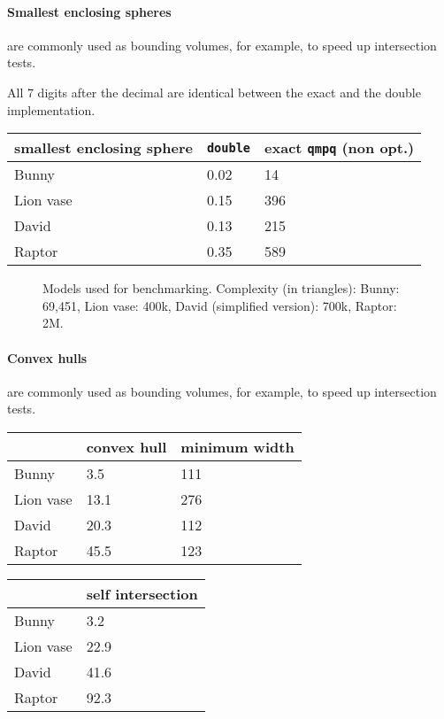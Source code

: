 
\paragraph{Smallest enclosing spheres} are commonly used as bounding
volumes, for example, to speed up intersection tests.

All 7 digits after the decimal are identical between the exact and the
double implementation.

\begin{tabular}{l|ll}
  \textbf{smallest enclosing sphere} & \texttt{double} & exact
    \texttt{qmpq} (non opt.)\\\hline
  Bunny     & 0.02 &  14 \\
  Lion vase & 0.15 & 396 \\
  David     & 0.13 & 215 \\
  Raptor    & 0.35  & 589
\end{tabular}


\begin{figure}
  \centering
  \caption{Models used for benchmarking. 
           Complexity (in triangles):
           Bunny: 69,451,
           Lion vase: 400k,
           David (simplified version): 700k,
           Raptor: 2M.}
  \label{fig:models}
\end{figure}

\paragraph{Convex hulls} are commonly used as bounding
volumes, for example, to speed up intersection tests.

\begin{tabular}{l|ll}
  & \textbf{convex hull} & \textbf{minimum width} \\\hline
  Bunny     &  3.5 & 111 \\
  Lion vase & 13.1 & 276 \\
  David     & 20.3 & 112 \\
  Raptor    & 45.5 & 123
\end{tabular}

\begin{tabular}{l|l}
  & \textbf{self intersection} \\\hline
  Bunny     & 3.2 \\
  Lion vase & 22.9 \\
  David     & 41.6 \\
  Raptor    & 92.3
\end{tabular}

